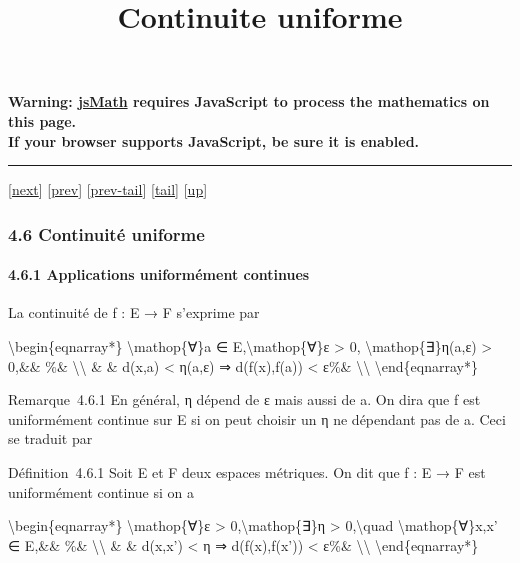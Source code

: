 \documentclass[]{article}
\title{Continuite uniforme}
\author{}
\date{}
\begin{document}
\maketitle

\textbf{Warning: \href{http://www.math.union.edu/locate/jsMath}{jsMath}
requires JavaScript to process the mathematics on this page.\\ If your
browser supports JavaScript, be sure it is enabled.}

\begin{center}\rule{3in}{0.4pt}\end{center}

{[}\href{coursse24.html}{next}{]} {[}\href{coursse22.html}{prev}{]}
{[}\href{coursse22.html\#tailcoursse22.html}{prev-tail}{]}
{[}\hyperref[tailcoursse23.html]{tail}{]}
{[}\href{coursch5.html\#coursse23.html}{up}{]}

\subsubsection{4.6 Continuité uniforme}

\paragraph{4.6.1 Applications uniformément continues}

La continuité de f : E → F s'exprime par

\textbackslash{}begin\{eqnarray*\} \textbackslash{}mathop\{∀\}a ∈
E,\textbackslash{}mathop\{∀\}ε \textgreater{} 0,
\textbackslash{}mathop\{∃\}η(a,ε) \textgreater{} 0,\&\& \%\&
\textbackslash{}\textbackslash{} \& \& d(x,a) \textless{} η(a,ε) ⇒
d(f(x),f(a)) \textless{} ε\%\& \textbackslash{}\textbackslash{}
\textbackslash{}end\{eqnarray*\}

Remarque~4.6.1 En général, η dépend de ε mais aussi de a. On dira que f
est uniformément continue sur E si on peut choisir un η ne dépendant pas
de a. Ceci se traduit par

Définition~4.6.1 Soit E et F deux espaces métriques. On dit que f : E →
F est uniformément continue si on a

\textbackslash{}begin\{eqnarray*\} \textbackslash{}mathop\{∀\}ε
\textgreater{} 0,\textbackslash{}mathop\{∃\}η \textgreater{}
0,\textbackslash{}quad \textbackslash{}mathop\{∀\}x,x' ∈ E,\&\& \%\&
\textbackslash{}\textbackslash{} \& \& d(x,x') \textless{} η ⇒
d(f(x),f(x')) \textless{} ε\%\& \textbackslash{}\textbackslash{}
\textbackslash{}end\{eqnarray*\}
\end{document}
